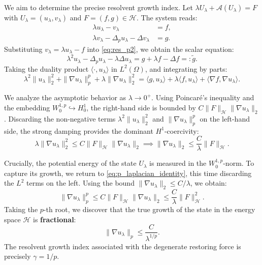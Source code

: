 \documentclass[11pt,reqno]{amsart}
\theoremstyle{remark}
\begin{document}
We aim to determine the precise resolvent growth index. Let $\lambda U_\lambda + \mathcal{A}(U_\lambda) = F$ with $U_\lambda=(u_\lambda,v_\lambda)$ and $F=(f,g) \in \mathcal{H}$. The system reads:
\begin{align}
    \lambda u_\lambda - v_\lambda &= f, \label{eq:res_p1} \\
    \lambda v_\lambda - \Delta_p u_\lambda - \Delta v_\lambda &= g. \label{eq:res_p2}
\end{align}
Substituting $v_\lambda = \lambda u_\lambda - f$ into \eqref{eq:res_p2}, we obtain the scalar equation:
\begin{equation} \label{eq:res_scalar_p}
    \lambda^2 u_\lambda - \Delta_p u_\lambda - \lambda \Delta u_\lambda = g + \lambda f - \Delta f =: \tilde{g}.
\end{equation}
Taking the duality product $\langle \cdot, u_\lambda \rangle$ in $L^2(\Omega)$, and integrating by parts:
\begin{equation}\label{eq:p_laplacian_identity}
    \lambda^2 \|u_\lambda\|_2^2 + \|\nabla u_\lambda\|_p^p + \lambda \|\nabla u_\lambda\|_2^2 = \langle g, u_\lambda \rangle + \lambda \langle f, u_\lambda \rangle + \langle \nabla f, \nabla u_\lambda \rangle.
\end{equation}

We analyze the asymptotic behavior as $\lambda \to 0^+$. Using Poincaré's inequality and the embedding $W_0^{1,p} \hookrightarrow H_0^1$, the right-hand side is bounded by $C \|F\|_{\mathcal{H}} \|\nabla u_\lambda\|_2$.
Discarding the non-negative terms $\lambda^2 \|u_\lambda\|_2^2$ and $\|\nabla u_\lambda\|_p^p$ on the left-hand side, the strong damping provides the dominant $H^1$-coercivity:
\begin{equation*}
    \lambda \|\nabla u_\lambda\|_2^2 \le C \|F\|_{\mathcal{H}} \|\nabla u_\lambda\|_2 \implies \|\nabla u_\lambda\|_2 \le \frac{C}{\lambda} \|F\|_{\mathcal{H}}.
\end{equation*}

Crucially, the potential energy of the state $U_\lambda$ is measured in the $W_0^{1,p}$-norm. To capture its growth, we return to \eqref{eq:p_laplacian_identity}, this time discarding the $L^2$ terms on the left. Using the bound $\|\nabla u_\lambda\|_2 \le C/\lambda$, we obtain:
\begin{equation*}
    \|\nabla u_\lambda\|_p^p \le C \|F\|_{\mathcal{H}} \|\nabla u_\lambda\|_2 \le \frac{C}{\lambda} \|F\|_{\mathcal{H}}^2.
\end{equation*}
Taking the $p$-th root, we discover that the true growth of the state in the energy space $\mathcal{H}$ is \textbf{fractional}:
\begin{equation}\label{eq:fractional_resolvent_p}
    \|\nabla u_\lambda\|_p \le \frac{C}{\lambda^{1/p}}.
\end{equation}
The resolvent growth index associated with the degenerate restoring force is precisely $\gamma = 1/p$.
\end{document}
